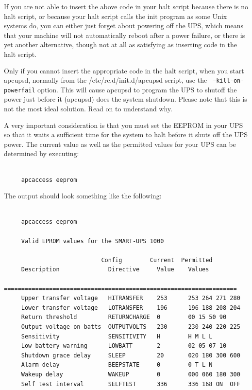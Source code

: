 If you are not able to insert the above code in your halt script because there
is no halt script, or because your halt script calls the init program as some
Unix systems do, you can either just forget about powering off the UPS, which
means that your machine will not automatically reboot after a power failure,
or there is yet another alternative, though not at all as satisfying as
inserting code in the halt script.  

Only if you cannot insert the appropriate code in the halt script, when you
start apcupsd, normally from the /etc/rc.d/init.d/apcupsd script, use the {\tt
--kill-on-powerfail} option. This will cause apcupsd to program the UPS to
shutoff the power just before it (apcupsd) does the system shutdown. Please
note that this is not the most ideal solution. Read on to understand why.  

A very important consideration is that you must set the EEPROM in your UPS so
that it waits a sufficient time for the system to halt before it shuts off the
UPS power. The current value as well as the permitted values for your UPS can
be determined by executing: 

\footnotesize
\begin{verbatim}
     
     apcaccess eeprom
\end{verbatim}
\normalsize

The output should look something like the following: 

\footnotesize
\begin{verbatim}
     
     apcaccess eeprom
     
     Valid EPROM values for the SMART-UPS 1000
     
                            Config        Current  Permitted
     Description              Directive     Value    Values
     ===================================================================
     Upper transfer voltage   HITRANSFER    253      253 264 271 280
     Lower transfer voltage   LOTRANSFER    196      196 188 208 204
     Return threshold         RETURNCHARGE  0        00 15 50 90
     Output voltage on batts  OUTPUTVOLTS   230      230 240 220 225
     Sensitivity              SENSITIVITY   H        H M L L
     Low battery warning      LOWBATT       2        02 05 07 10
     Shutdown grace delay     SLEEP         20       020 180 300 600
     Alarm delay              BEEPSTATE     0        0 T L N
     Wakeup delay             WAKEUP        0        000 060 180 300
     Self test interval       SELFTEST      336      336 168 ON  OFF
     
\end{verbatim}
\normalsize

